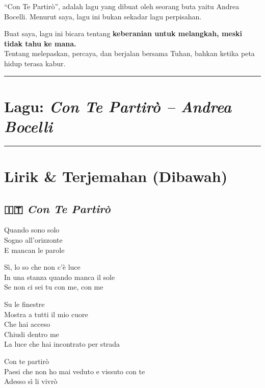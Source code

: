 \documentclass[
  letterpaper,
  DIV=11,
  numbers=noendperiod]{scrreprt}
\begin{document}
``Con Te Partirò'', adalah lagu yang dibuat oleh seorang buta yaitu
Andrea Bocelli. Menurut saya, lagu ini bukan sekadar lagu perpisahan.

Buat saya, lagu ini bicara tentang \textbf{keberanian untuk melangkah,
meski tidak tahu ke mana.}\\
Tentang melepaskan, percaya, dan berjalan bersama Tuhan, bahkan ketika
peta hidup terasa kabur.

\begin{center}\rule{0.5\linewidth}{0.5pt}\end{center}

\section{\texorpdfstring{Lagu: \emph{Con Te Partirò -- Andrea
Bocelli}}{Lagu: Con Te Partirò -- Andrea Bocelli}}\label{lagu-con-te-partiruxf2-andrea-bocelli}

\begin{center}\rule{0.5\linewidth}{0.5pt}\end{center}

\section{Lirik \& Terjemahan (Dibawah)}\label{lirik-terjemahan-dibawah}

\subsection{\texorpdfstring{🇮🇹 \emph{Con Te
Partirò}}{🇮🇹 Con Te Partirò}}\label{con-te-partiruxf2}

Quando sono solo\\
Sogno all'orizzonte\\
E mancan le parole

Sì, lo so che non c'è luce\\
In una stanza quando manca il sole\\
Se non ci sei tu con me, con me

Su le finestre\\
Mostra a tutti il mio cuore\\
Che hai acceso\\
Chiudi dentro me\\
La luce che hai incontrato per strada

Con te partirò\\
Paesi che non ho mai veduto e vissuto con te\\
Adesso sì li vivrò
\end{document}
